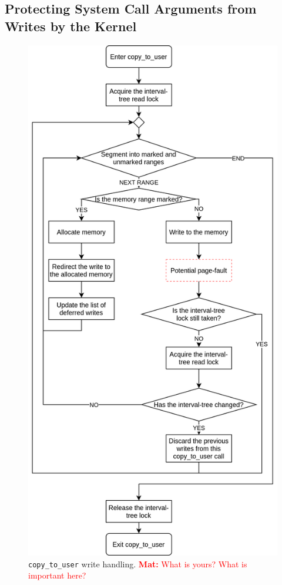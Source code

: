 \documentclass[conference]{IEEEtran}
\newcommand{\mat}[1]{\textcolor{red}{\textbf{Mat:} #1}}
\begin{document}
\subsection{Protecting System Call Arguments from Writes by the Kernel}
\label{subsec:kernelland}
\begin{figure}[]
  \centering
  \includegraphics[width = 0.8\linewidth]{img/copy_to_user.png}
  \caption{\texttt{copy\_to\_user} write handling.
\mat{What is yours? What is important here?}
}
  \label{fig:copytouser}
\end{figure}
\end{document}
